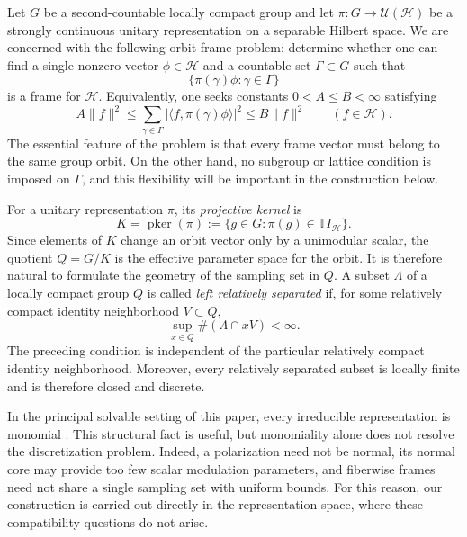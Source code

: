 \documentclass[reqno]{amsart}
\numberwithin{equation}{section}
\theoremstyle{definition}
\theoremstyle{remark}
\newcommand{\cH}{\mathcal H}
\newcommand{\T}{\mathbb T}
\newcommand{\U}{\mathcal U}
\newcommand{\pker}{\operatorname{pker}}
\begin{document}
Let $G$ be a second-countable locally compact group and let
$\pi:G\to\U(\cH)$ be a strongly continuous unitary representation on a
separable Hilbert space.  We are concerned with the following orbit-frame
problem: determine whether one can find a single nonzero vector
$\phi\in\cH$ and a countable set $\Gamma\subset G$ such that
\[
   \{\pi(\gamma)\phi:\gamma\in\Gamma\}
\]
is a frame for $\cH$.  Equivalently, one seeks constants
$0<A\leq B<\infty$ satisfying
\begin{equation}\label{eq:intro-frame-definition}
 A\|f\|^2
 \leq \sum_{\gamma\in\Gamma}
       |\langle f,\pi(\gamma)\phi\rangle|^2
 \leq B\|f\|^2
 \qquad(f\in\cH).
\end{equation}
The essential feature of the problem is that every frame vector must belong
to the same group orbit.  On the other hand, no subgroup or lattice condition
is imposed on $\Gamma$, and this flexibility will be important in the
construction below.

For a unitary representation $\pi$, its \emph{projective kernel} is
\begin{equation}\label{eq:projective-kernel}
 K=\pker(\pi)
   :=\{g\in G:\pi(g)\in\T I_{\cH}\}.
\end{equation}
Since elements of $K$ change an orbit vector only by a unimodular scalar, the
quotient $Q=G/K$ is the effective parameter space for the orbit.  It is
therefore natural to formulate the geometry of the sampling set in $Q$.  A
subset $\Lambda$ of a locally compact group $Q$ is called \emph{left
relatively separated} if, for some relatively
compact identity neighborhood $V\subset Q$,
\begin{equation}\label{eq:relative-separation}
  \sup_{x\in Q}\#(\Lambda\cap xV)<\infty.
\end{equation}
The preceding condition is independent of the particular relatively compact
identity neighborhood.  Moreover, every relatively separated subset is
locally finite and is therefore closed and discrete.

In the principal solvable setting of this paper, every irreducible
representation is monomial \cite{Pukanszky1968,LeptinLudwig1994}.  This
structural fact is useful, but monomiality alone does not resolve the
discretization problem.  Indeed, a polarization need not be normal, its
normal core may provide too few scalar modulation parameters, and fiberwise
frames need not share a single sampling set with uniform bounds.  For this
reason, our construction is carried out directly in the representation
space, where these compatibility questions do not arise.
\end{document}
